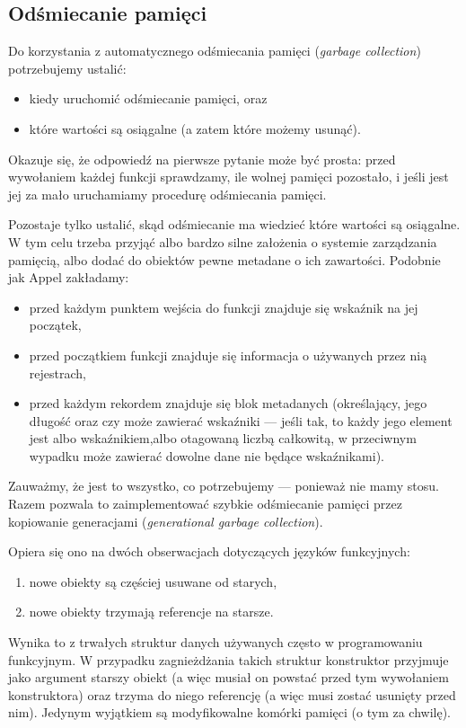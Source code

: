 \documentclass[11pt]{scrartcl}
\begin{document}
\subsection{Odśmiecanie pamięci}
Do korzystania z automatycznego odśmiecania pamięci (\textit{garbage collection})
potrzebujemy ustalić:
\begin{itemize}
\item  kiedy uruchomić odśmiecanie pamięci, oraz
\item które wartości są osiągalne (a zatem które możemy usunąć).
\end{itemize}
Okazuje się, że odpowiedź na pierwsze pytanie może być prosta: przed wywołaniem
każdej funkcji sprawdzamy, ile wolnej pamięci pozostało, i jeśli jest jej za
mało uruchamiamy procedurę odśmiecania pamięci.

Pozostaje tylko ustalić, skąd odśmiecanie ma wiedzieć które wartości są
osiągalne. W tym celu trzeba przyjąć albo bardzo silne założenia o systemie
zarządzania pamięcią, albo dodać do obiektów pewne metadane o ich zawartości.
Podobnie jak Appel \cite{Appel16.4} zakładamy:
\begin{itemize}
\item przed każdym punktem wejścia do funkcji znajduje się wskaźnik na jej
  początek,
\item przed początkiem funkcji znajduje się informacja o używanych przez nią
  rejestrach,
\item przed każdym rekordem znajduje się blok metadanych (określający, jego
  długość oraz czy może zawierać wskaźniki --- jeśli tak, to każdy jego element
  jest albo wskaźnikiem,albo otagowaną liczbą całkowitą, w przeciwnym wypadku
  może zawierać dowolne dane nie będące wskaźnikami).
\end{itemize}

Zauważmy, że jest to wszystko, co potrzebujemy --- ponieważ nie mamy stosu. Razem
pozwala to zaimplementować szybkie odśmiecanie pamięci przez kopiowanie
generacjami (\textit{generational garbage collection}).

Opiera się ono na dwóch obserwacjach dotyczących języków funkcyjnych:
\begin{enumerate}
\item nowe obiekty są częściej usuwane od starych,
\item nowe obiekty trzymają referencje na starsze.
\end{enumerate}

Wynika to z trwałych struktur danych używanych często w programowaniu
funkcyjnym. W przypadku zagnieżdżania takich struktur konstruktor przyjmuje jako
argument starszy obiekt (a więc musiał on powstać przed tym wywołaniem
konstruktora) oraz trzyma do niego referencję (a więc musi zostać usunięty przed
nim). Jedynym wyjątkiem są modyfikowalne komórki pamięci (o tym za chwilę).
\end{document}
